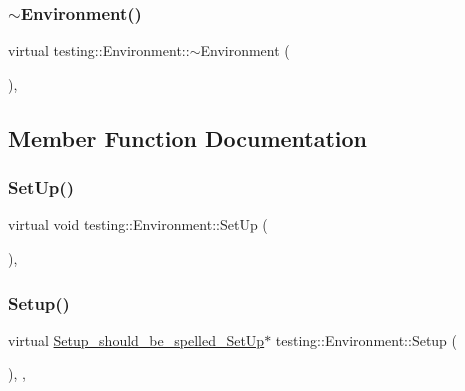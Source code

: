 \subsubsection{\texorpdfstring{$\sim$\+Environment()}{~Environment()}}
{\footnotesize\ttfamily virtual testing\+::\+Environment\+::$\sim$\+Environment (\begin{DoxyParamCaption}{ }\end{DoxyParamCaption})\hspace{0.3cm}{\ttfamily [inline]}, {\ttfamily [virtual]}}



\subsection{Member Function Documentation}
\mbox{\label{classtesting_1_1Environment_a1bf8cafaa9d4eba9feb98655ee434eb3}} 
\subsubsection{\texorpdfstring{Set\+Up()}{SetUp()}}
{\footnotesize\ttfamily virtual void testing\+::\+Environment\+::\+Set\+Up (\begin{DoxyParamCaption}{ }\end{DoxyParamCaption})\hspace{0.3cm}{\ttfamily [inline]}, {\ttfamily [virtual]}}

\mbox{\label{classtesting_1_1Environment_a6096a69b03f6eb727a69a39f854cc87b}} 
\subsubsection{\texorpdfstring{Setup()}{Setup()}}
{\footnotesize\ttfamily virtual \hyperlink{structtesting_1_1Environment_1_1Setup__should__be__spelled__SetUp}{Setup\+\_\+should\+\_\+be\+\_\+spelled\+\_\+\+Set\+Up}$\ast$ testing\+::\+Environment\+::\+Setup (\begin{DoxyParamCaption}{ }\end{DoxyParamCaption})\hspace{0.3cm}{\ttfamily [inline]}, {\ttfamily [private]}, {\ttfamily [virtual]}}

